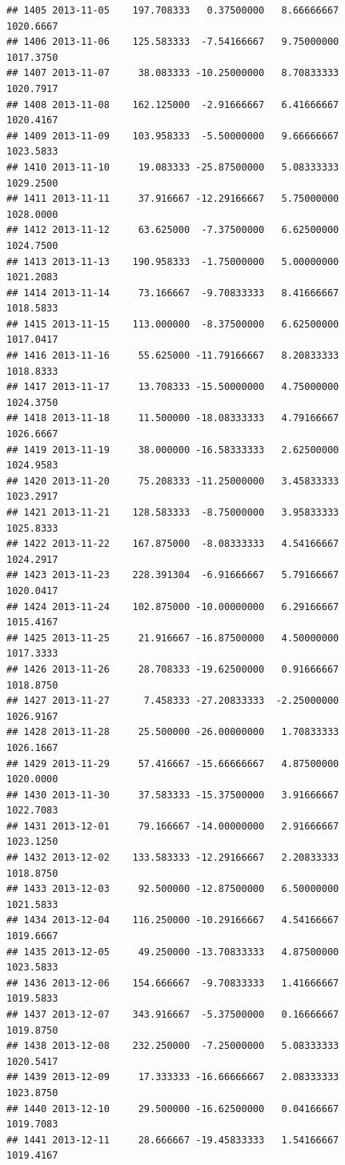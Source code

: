 \documentclass[
]{article}
\begin{document}
\begin{verbatim}
## 1405 2013-11-05    197.708333   0.37500000   8.66666667    1020.6667
## 1406 2013-11-06    125.583333  -7.54166667   9.75000000    1017.3750
## 1407 2013-11-07     38.083333 -10.25000000   8.70833333    1020.7917
## 1408 2013-11-08    162.125000  -2.91666667   6.41666667    1020.4167
## 1409 2013-11-09    103.958333  -5.50000000   9.66666667    1023.5833
## 1410 2013-11-10     19.083333 -25.87500000   5.08333333    1029.2500
## 1411 2013-11-11     37.916667 -12.29166667   5.75000000    1028.0000
## 1412 2013-11-12     63.625000  -7.37500000   6.62500000    1024.7500
## 1413 2013-11-13    190.958333  -1.75000000   5.00000000    1021.2083
## 1414 2013-11-14     73.166667  -9.70833333   8.41666667    1018.5833
## 1415 2013-11-15    113.000000  -8.37500000   6.62500000    1017.0417
## 1416 2013-11-16     55.625000 -11.79166667   8.20833333    1018.8333
## 1417 2013-11-17     13.708333 -15.50000000   4.75000000    1024.3750
## 1418 2013-11-18     11.500000 -18.08333333   4.79166667    1026.6667
## 1419 2013-11-19     38.000000 -16.58333333   2.62500000    1024.9583
## 1420 2013-11-20     75.208333 -11.25000000   3.45833333    1023.2917
## 1421 2013-11-21    128.583333  -8.75000000   3.95833333    1025.8333
## 1422 2013-11-22    167.875000  -8.08333333   4.54166667    1024.2917
## 1423 2013-11-23    228.391304  -6.91666667   5.79166667    1020.0417
## 1424 2013-11-24    102.875000 -10.00000000   6.29166667    1015.4167
## 1425 2013-11-25     21.916667 -16.87500000   4.50000000    1017.3333
## 1426 2013-11-26     28.708333 -19.62500000   0.91666667    1018.8750
## 1427 2013-11-27      7.458333 -27.20833333  -2.25000000    1026.9167
## 1428 2013-11-28     25.500000 -26.00000000   1.70833333    1026.1667
## 1429 2013-11-29     57.416667 -15.66666667   4.87500000    1020.0000
## 1430 2013-11-30     37.583333 -15.37500000   3.91666667    1022.7083
## 1431 2013-12-01     79.166667 -14.00000000   2.91666667    1023.1250
## 1432 2013-12-02    133.583333 -12.29166667   2.20833333    1018.8750
## 1433 2013-12-03     92.500000 -12.87500000   6.50000000    1021.5833
## 1434 2013-12-04    116.250000 -10.29166667   4.54166667    1019.6667
## 1435 2013-12-05     49.250000 -13.70833333   4.87500000    1023.5833
## 1436 2013-12-06    154.666667  -9.70833333   1.41666667    1019.5833
## 1437 2013-12-07    343.916667  -5.37500000   0.16666667    1019.8750
## 1438 2013-12-08    232.250000  -7.25000000   5.08333333    1020.5417
## 1439 2013-12-09     17.333333 -16.66666667   2.08333333    1023.8750
## 1440 2013-12-10     29.500000 -16.62500000   0.04166667    1019.7083
## 1441 2013-12-11     28.666667 -19.45833333   1.54166667    1019.4167

\end{verbatim}
\end{document}
